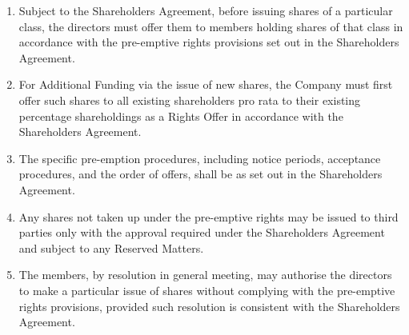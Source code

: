 \begin{enumerate}[label=(\alph*)]
    \item Subject to the Shareholders Agreement, before issuing shares of a particular class, the directors must offer them to members holding shares of that class in accordance with the pre-emptive rights provisions set out in the Shareholders Agreement.
    
    \item For Additional Funding via the issue of new shares, the Company must first offer such shares to all existing shareholders pro rata to their existing percentage shareholdings as a Rights Offer in accordance with the Shareholders Agreement.
    
    \item The specific pre-emption procedures, including notice periods, acceptance procedures, and the order of offers, shall be as set out in the Shareholders Agreement.
    
    \item Any shares not taken up under the pre-emptive rights may be issued to third parties only with the approval required under the Shareholders Agreement and subject to any Reserved Matters.
    
    \item The members, by resolution in general meeting, may authorise the directors to make a particular issue of shares without complying with the pre-emptive rights provisions, provided such resolution is consistent with the Shareholders Agreement.
\end{enumerate} 